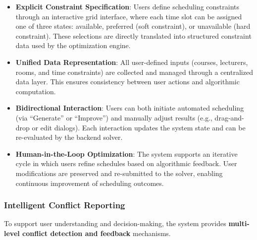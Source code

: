 \documentclass[11pt,a4paper]{article}
\begin{document}
\begin{itemize}
    \item \textbf{Explicit Constraint Specification}: Users define scheduling constraints through an interactive grid interface, where each time slot can be assigned one of three states: available, preferred (soft constraint), or unavailable (hard constraint). These selections are directly translated into structured constraint data used by the optimization engine.
    
    \item \textbf{Unified Data Representation}: All user-defined inputs (courses, lecturers, rooms, and time constraints) are collected and managed through a centralized data layer. This ensures consistency between user actions and algorithmic computation.
    
    \item \textbf{Bidirectional Interaction}: Users can both initiate automated scheduling (via ``Generate'' or ``Improve'') and manually adjust results (e.g., drag-and-drop or edit dialogs). Each interaction updates the system state and can be re-evaluated by the backend solver.
    
    \item \textbf{Human-in-the-Loop Optimization}: The system supports an iterative cycle in which users refine schedules based on algorithmic feedback. User modifications are preserved and re-submitted to the solver, enabling continuous improvement of scheduling outcomes.
\end{itemize}


\subsubsection{Intelligent Conflict Reporting}

To support user understanding and decision-making, the system provides \textbf{multi-level conflict detection and feedback} mechanisms.
\end{document}
